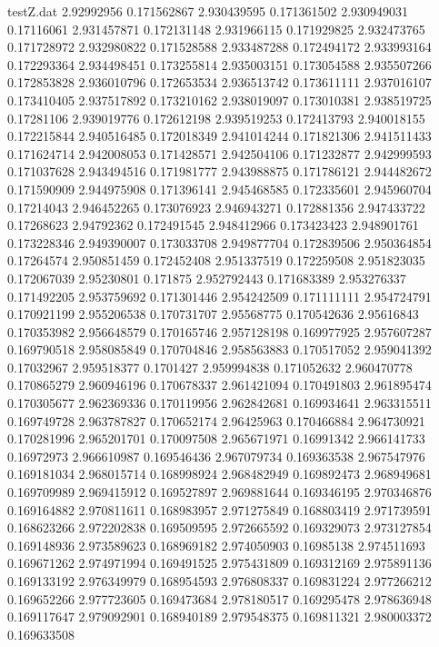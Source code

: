 \begin{filecontents*}{testZ.dat}
2.92992956  0.171562867
2.930439595  0.171361502
2.930949031  0.17116061
2.931457871  0.172131148
2.931966115  0.171929825
2.932473765  0.171728972
2.932980822  0.171528588
2.933487288  0.172494172
2.933993164  0.172293364
2.934498451  0.173255814
2.935003151  0.173054588
2.935507266  0.172853828
2.936010796  0.172653534
2.936513742  0.173611111
2.937016107  0.173410405
2.937517892  0.173210162
2.938019097  0.173010381
2.938519725  0.17281106
2.939019776  0.172612198
2.939519253  0.172413793
2.940018155  0.172215844
2.940516485  0.172018349
2.941014244  0.171821306
2.941511433  0.171624714
2.942008053  0.171428571
2.942504106  0.171232877
2.942999593  0.171037628
2.943494516  0.171981777
2.943988875  0.171786121
2.944482672  0.171590909
2.944975908  0.171396141
2.945468585  0.172335601
2.945960704  0.17214043
2.946452265  0.173076923
2.946943271  0.172881356
2.947433722  0.17268623
2.94792362  0.172491545
2.948412966  0.173423423
2.948901761  0.173228346
2.949390007  0.173033708
2.949877704  0.172839506
2.950364854  0.17264574
2.950851459  0.172452408
2.951337519  0.172259508
2.951823035  0.172067039
2.95230801  0.171875
2.952792443  0.171683389
2.953276337  0.171492205
2.953759692  0.171301446
2.954242509  0.171111111
2.954724791  0.170921199
2.955206538  0.170731707
2.95568775  0.170542636
2.95616843  0.170353982
2.956648579  0.170165746
2.957128198  0.169977925
2.957607287  0.169790518
2.958085849  0.170704846
2.958563883  0.170517052
2.959041392  0.17032967
2.959518377  0.1701427
2.959994838  0.171052632
2.960470778  0.170865279
2.960946196  0.170678337
2.961421094  0.170491803
2.961895474  0.170305677
2.962369336  0.170119956
2.962842681  0.169934641
2.963315511  0.169749728
2.963787827  0.170652174
2.96425963  0.170466884
2.964730921  0.170281996
2.965201701  0.170097508
2.965671971  0.16991342
2.966141733  0.16972973
2.966610987  0.169546436
2.967079734  0.169363538
2.967547976  0.169181034
2.968015714  0.168998924
2.968482949  0.169892473
2.968949681  0.169709989
2.969415912  0.169527897
2.969881644  0.169346195
2.970346876  0.169164882
2.970811611  0.168983957
2.971275849  0.168803419
2.971739591  0.168623266
2.972202838  0.169509595
2.972665592  0.169329073
2.973127854  0.169148936
2.973589623  0.168969182
2.974050903  0.16985138
2.974511693  0.169671262
2.974971994  0.169491525
2.975431809  0.169312169
2.975891136  0.169133192
2.976349979  0.168954593
2.976808337  0.169831224
2.977266212  0.169652266
2.977723605  0.169473684
2.978180517  0.169295478
2.978636948  0.169117647
2.979092901  0.168940189
2.979548375  0.169811321
2.980003372  0.169633508

\end{filecontents*}

